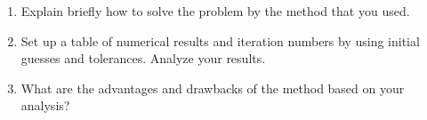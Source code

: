 \documentclass[11pt,oneside]{extarticle}
\begin{document}
\begin{enumerate}

    \item Explain briefly how to solve the problem by the method that you used.

    \item Set up a table of numerical results and iteration numbers by using
        initial guesses and tolerances. Analyze your results.

    \item What are the advantages and drawbacks of the method based on your
        analysis?

\end{enumerate}
\end{document}
